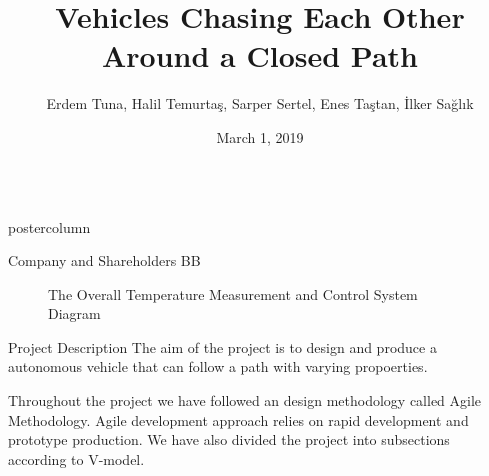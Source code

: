 \documentclass{beamer}
\title{\huge Vehicles Chasing Each Other \\Around a Closed Path}
\author{Erdem Tuna, Halil Temurtaş, Sarper Sertel, Enes Taştan, İlker Sağlık}
\institute[ETH]{$^{1}$Department of Electrical and Electronics Engineering, Middle East Technical University%
}
\date{March 1, 2019}
\newlength{\columnheight}
\begin{document}
\begin{frame}
\begin{columns}
	\begin{column}{.5\textwidth}
		\begin{beamercolorbox}[center]{postercolumn}
			\begin{minipage}{.98\textwidth}  %
				\parbox[t][\columnheight]{\textwidth}{ %
					\begin{myblock}{Company and Shareholders}
BB

						\vspace{0.4em}
						\begin{figure}
								\centering
								\caption{The Overall Temperature Measurement and Control System Diagram}
								\label{fig:overall-system}
						\end{figure}
					\end{myblock}	\vspace{.5cm}
				
					\begin{myblock}{Project Description}
						The aim of the project is to design and produce a autonomous vehicle that can follow a path with varying propoerties.
						
						Throughout the project we have followed an design methodology called Agile Methodology. Agile development approach relies on rapid development and prototype production. We have also divided the project into subsections according to V-model.
						
					\end{myblock}	\vspace{0.4em}
				
}
\end{minipage}
\end{beamercolorbox}
\end{column}
\end{columns}
\end{frame}
\end{document}
